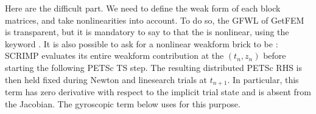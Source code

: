 \documentclass[letterpaper,10pt,english]{sphinxmanual}
\begin{document}
\begin{sphinxVerbatim}[commandchars=\\\{\}]
  
  
  \PYG{p}{[}
        
        
\PYG{p}{]}

   
\end{sphinxVerbatim}

\sphinxAtStartPar
Here are the difficult part. We need to define the weak form of each
block matrices, and take non\sphinxhyphen{}linearities into account. To do so, the
GFWL of GetFEM is transparent, but it is mandatory to say to 
that the  is non\sphinxhyphen{}linear, using the keyword . It
is also possible to ask for a nonlinear weak\sphinxhyphen{}form brick to be
: SCRIMP evaluates its entire weak\sphinxhyphen{}form contribution
at the  \((t_n,z_n)\) before starting
the following PETSc TS step. The resulting distributed PETSc RHS is
then held fixed during  Newton and line\sphinxhyphen{}search trials at
\(t_{n+1}\). In particular, this term has zero derivative with
respect to the implicit trial state and is absent from the Jacobian.
The gyroscopic  term below uses  for this
purpose.
\end{document}
